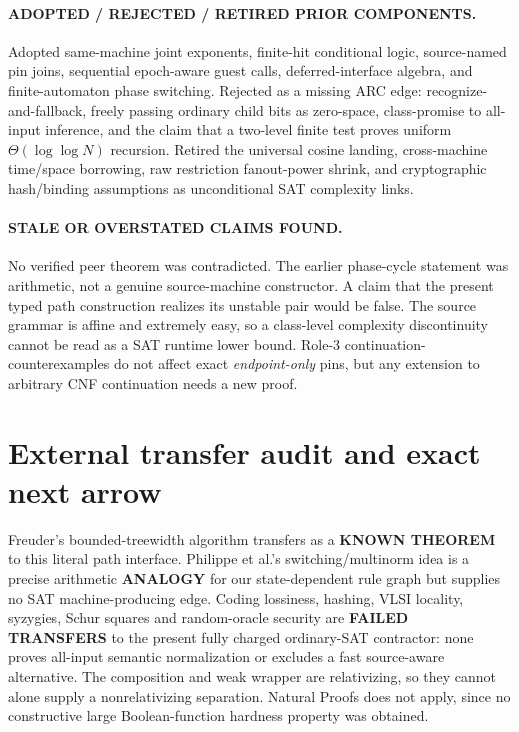 \documentclass[11pt]{article}
\begin{document}
\paragraph{ADOPTED / REJECTED / RETIRED PRIOR COMPONENTS.}
Adopted same-machine joint exponents,
finite-hit conditional logic, source-named
pin joins, sequential epoch-aware guest
calls, deferred-interface algebra, and
finite-automaton phase switching.
Rejected as a missing ARC edge:
recognize-and-fallback, freely passing
ordinary child bits as zero-space,
class-promise to all-input inference,
and the claim that a two-level finite test
proves uniform $\Theta(\log\log N)$ recursion.
Retired the universal cosine landing,
cross-machine time/space borrowing,
raw restriction fanout-power shrink,
and cryptographic hash/binding assumptions
as unconditional SAT complexity links.

\paragraph{STALE OR OVERSTATED CLAIMS FOUND.}
No verified peer theorem was contradicted.
The earlier phase-cycle statement was
arithmetic, not a genuine source-machine
constructor. A claim that the present
typed path construction realizes its
unstable pair would be false. The
source grammar is affine and extremely
easy, so a class-level complexity
discontinuity cannot be read as a
SAT runtime lower bound. Role-3
continuation-counterexamples do not
affect exact \emph{endpoint-only}
pins, but any extension to arbitrary
CNF continuation needs a new proof.

\section{External transfer audit and exact next arrow}

Freuder's bounded-treewidth algorithm
transfers as a \textbf{KNOWN THEOREM}
to this literal path interface.
Philippe et al.'s switching/multinorm
idea is a precise arithmetic
\textbf{ANALOGY} for our state-dependent
rule graph but supplies no SAT
machine-producing edge.
Coding lossiness, hashing,
VLSI locality, syzygies,
Schur squares and random-oracle
security are \textbf{FAILED TRANSFERS}
to the present fully charged
ordinary-SAT contractor: none
proves all-input semantic
normalization or excludes a fast
source-aware alternative.
The composition and weak wrapper
are relativizing, so they cannot
alone supply a nonrelativizing
separation. Natural Proofs
does not apply, since no
constructive large Boolean-function
hardness property was obtained.
\end{document}
